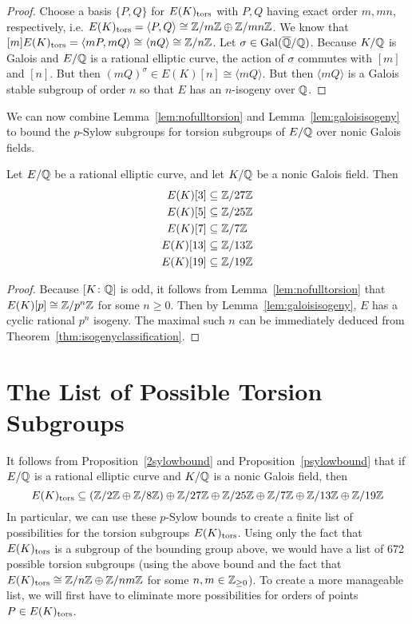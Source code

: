 \begin{proof}
Choose a basis $\{ P , Q \}$ for $E(K)_{\text{tors}}$ with $P, Q$ having exact order $m, mn$, respectively, i.e. $E(K)_{\text{tors}}= \langle P, Q \rangle \cong \mathbb{Z}/m\mathbb{Z} \oplus \mathbb{Z}/mn\mathbb{Z}$. We know that $[m] E(K)_{\text{tors}}= \langle mP,mQ \rangle \cong \langle nQ \rangle \cong \mathbb{Z}/n\mathbb{Z}$. Let $\sigma \in \operatorname{Gal}(\overline{\mathbb{Q}}/\mathbb{Q})$. Because $K/\mathbb{Q}$ is Galois and $E/\mathbb{Q}$ is a rational elliptic curve, the action of $\sigma$ commutes with $[m]$ and $[n]$. But then $(mQ)^\sigma \in E(K)[n] \cong \langle mQ \rangle$. But then $\langle mQ \rangle$ is a Galois stable subgroup of order $n$ so that $E$ has an $n$-isogeny over $\mathbb{Q}$. 
\end{proof}


We can now combine Lemma~\ref{lem:nofulltorsion} and Lemma~\ref{lem:galoisisogeny} to bound the $p$-Sylow subgroups for torsion subgroups of $E/\mathbb{Q}$ over nonic Galois fields. 


\begin{prop} \label{psylowbound}
Let $E/\mathbb{Q}$ be a rational elliptic curve, and let $K/\mathbb{Q}$ be a nonic Galois field. Then
	\[
	\begin{aligned}
	E(K)[3] &\subseteq \mathbb{Z}/27\mathbb{Z} \\
	E(K)[5] &\subseteq \mathbb{Z}/25\mathbb{Z} \\
	E(K)[7] &\subseteq \mathbb{Z}/7\mathbb{Z} \\
	E(K)[13] &\subseteq \mathbb{Z}/13\mathbb{Z} \\
	E(K)[19] &\subseteq \mathbb{Z}/19\mathbb{Z}
	\end{aligned}
	\]
\end{prop}

\begin{proof}
Because $[K \colon \mathbb{Q}]$ is odd, it follows from Lemma~\ref{lem:nofulltorsion} that $E(K)[p] \cong \mathbb{Z}/p^n\mathbb{Z}$ for some $n \geq 0$. Then by Lemma~\ref{lem:galoisisogeny}, $E$ has a cyclic rational $p^n$ isogeny. The maximal such $n$ can be immediately deduced from Theorem~\ref{thm:isogenyclassification}.
\end{proof}





\section{The List of Possible Torsion Subgroups\label{sec:noniclist}}

It follows from Proposition~\ref{2sylowbound} and Proposition~\ref{psylowbound} that if $E/\mathbb{Q}$ is a rational elliptic curve and $K/\mathbb{Q}$ is a nonic Galois field, then
	\[
	E(K)_{\text{tors}} \subseteq (\mathbb{Z}/2\mathbb{Z} \oplus \mathbb{Z}/8\mathbb{Z}) \oplus \mathbb{Z}/27\mathbb{Z} \oplus \mathbb{Z}/25\mathbb{Z} \oplus \mathbb{Z}/7\mathbb{Z} \oplus \mathbb{Z}/13\mathbb{Z} \oplus \mathbb{Z}/19\mathbb{Z}
	\]
In particular, we can use these $p$-Sylow bounds to create a finite list of possibilities for the torsion subgroups $E(K)_{\text{tors}}$. Using only the fact that $E(K)_{\text{tors}}$ is a subgroup of the bounding group above, we would have a list of 672 possible torsion subgroups (using the above bound and the fact that $E(K)_{\text{tors}} \cong \mathbb{Z}/n\mathbb{Z} \oplus \mathbb{Z}/nm\mathbb{Z}$ for some $n,m \in \mathbb{Z}_{\geq 0}$). To create a more manageable list, we will first have to eliminate more possibilities for orders of points $P \in E(K)_{\text{tors}}$. 


